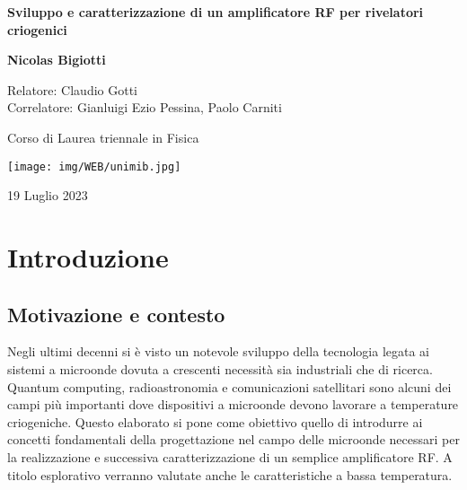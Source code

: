 \documentclass[12pt,oneside]{book}
\begin{document}
\begin{titlepage}
    \begin{center}
        \vspace*{1cm}
            
        \Huge
        \textbf{Sviluppo e caratterizzazione di un amplificatore RF per rivelatori criogenici}
            
        \vspace{0.5cm}
        \LARGE
            
        \vspace{1.5cm}
            
        \textbf{Nicolas Bigiotti}
            
        \vfill

        
        Relatore: Claudio Gotti \hspace{30pt} \dotfill\\
        Correlatore: Gianluigi Ezio Pessina, Paolo Carniti
            
        \vspace{0.8cm}

        Corso di Laurea triennale in Fisica
            
        \vspace{0.8cm}
            
        \texttt{[image: img/WEB/unimib.jpg]}

            
        \Large
        19 Luglio 2023
            
    \end{center}
\end{titlepage}
\restoregeometry 

\tableofcontents

\chapter{Introduzione}
\section{Motivazione e contesto}
Negli ultimi decenni si è visto un notevole sviluppo della tecnologia legata ai sistemi a microonde dovuta a crescenti necessità sia industriali che di ricerca.
Quantum computing, radioastronomia e comunicazioni satellitari sono alcuni dei campi più importanti dove dispositivi a microonde devono lavorare a temperature
criogeniche. Questo elaborato si pone come obiettivo quello di introdurre ai concetti fondamentali della progettazione nel campo delle microonde necessari per
la realizzazione e successiva caratterizzazione di un semplice amplificatore RF. A titolo esplorativo verranno valutate anche le caratteristiche a bassa
temperatura.
\end{document}
